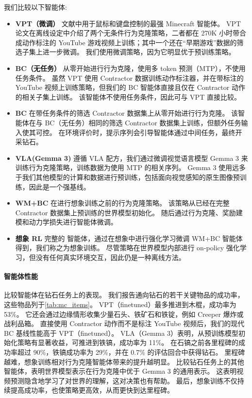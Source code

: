 \documentclass[11pt]{article}
\begin{document}
\pagebreak
我们比较以下智能体:

\begin{itemize}
\item\textbf{VPT（微调）}\quad
文献中用于鼠标和键盘控制的最强 Minecraft 智能体\citep{vpt}。
VPT 论文在离线设定中介绍了两个无条件行为克隆策略，二者都在 270K 小时带合成动作标注的 YouTube 游戏视频上训练；其中一个还在“早期游戏”数据的筛选子集上进一步微调。
我们使用微调策略，因为它明显优于预训练策略。

\item\textbf{BC（无任务）}\quad
从零开始进行行为克隆，使用多 token 预测（MTP），不使用任务条件。
虽然 VPT 使用 Contractor 数据训练动作标注器，并在带标注的 YouTube 视频上训练策略，但我们的 BC 智能体直接且仅在 Contractor 动作的相关子集上训练。
该智能体不使用任务条件，因此可与 VPT 直接比较。

\item\textbf{BC}\quad
在带任务条件的筛选 Contractor 数据集上从零开始进行行为克隆。
该智能体在与 BC（无任务）相同的筛选 Contractor 数据集上训练，但额外任务输入使其可控。
在环境评价时，提示序列会引导智能体通过中间任务，最终开采钻石。

\item\textbf{VLA(Gemma 3)}\quad
遵循 VLA 配方\citep{kim2024openvla,intelligence2025pi05}，我们通过微调视觉语言模型 Gemma 3 来训练行为克隆策略\citep{team2025gemma3}，训练数据为使用 MTP 的相关序列。
Gemma 3 使用远多于我们其他模型的计算和数据进行预训练，包括面向视觉感知的原生图像预训练，因此是一个强基线。

\item\textbf{WM+BC}\quad
\method{} 在进行想象训练之前的行为克隆策略。
该策略从已经在完整 Contractor 数据集上预训练的世界模型初始化。
随后通过行为克隆、奖励建模和动力学损失进行智能体微调。

\item\textbf{想象 RL}\quad
完整的 \method 智能体，通过在想象中进行强化学习微调 WM+BC 智能体得到，我们称之为想象训练。
尽管策略在世界模型内部进行 on-policy 强化学习，但没有任何真实环境交互，因此仍是一种离线方法。
\end{itemize}



\paragraph{智能体性能}
 比较智能体在钻石任务上的表现。
我们报告通向钻石的若干关键物品的成功率，这些物品列于\cref{tab:mc_items}。
VPT（finetuned）最多推进到木棍，成功率为 53\%。
它还会通过边缘情形收集少量石头、铁矿石和铁锭，例如 Creeper 爆炸或战利品箱。
直接使用 Contractor 动作而不是标注 YouTube 视频后，我们的现代 BC 基线性能高于 VPT（finetuned）。
VLA（Gemma 3）表明，从预训练模型初始化策略有显著收益，可推进到铁镐，成功率为 11\%。
\method 在石镐之前各里程碑的成功率超过 90\%，铁镐成功率为 29\%，并在 0.7\% 的评估回合中获得钻石。
里程碑越难，想象训练相对行为克隆智能体带来的提升越明显。
 比较钻石任务上的其他智能体，表明世界模型表示在行为克隆中优于 Gemma 3 的通用表示。
这表明视频预测隐含地学习了对世界的理解，这对决策也有帮助。
最后，想象训练不仅持续提高成功率，也使策略更高效，从而更快到达里程碑。
\end{document}

